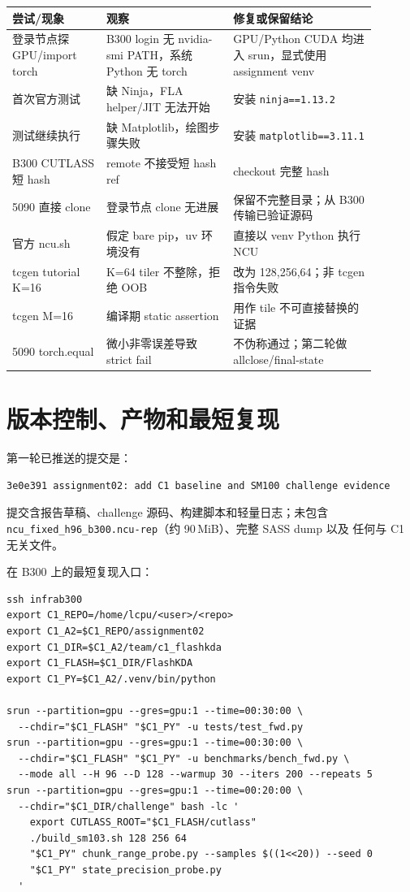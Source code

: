 \documentclass[11pt,a4paper,fontset=none]{ctexart}
\newcommand{\code}[1]{\texttt{#1}}
\begin{document}
\begin{longtable}{@{}L{0.23\linewidth}L{0.31\linewidth}L{0.35\linewidth}@{}}
\toprule
尝试/现象 & 观察 & 修复或保留结论 \\
\midrule
\endhead
\bottomrule
\endlastfoot
登录节点探 GPU/import torch & B300 login 无 nvidia-smi PATH，系统 Python 无 torch & GPU/Python CUDA 均进入 srun，显式使用 assignment venv \\
首次官方测试 & 缺 Ninja，FLA helper/JIT 无法开始 & 安装 \code{ninja==1.13.2} \\
测试继续执行 & 缺 Matplotlib，绘图步骤失败 & 安装 \code{matplotlib==3.11.1} \\
B300 CUTLASS 短 hash & remote 不接受短 hash ref & checkout 完整 hash \\
5090 直接 clone & 登录节点 clone 无进展 & 保留不完整目录；从 B300 传输已验证源码 \\
官方 ncu.sh & 假定 bare pip，uv 环境没有 & 直接以 venv Python 执行 NCU \\
tcgen tutorial K=16 & K=64 tiler 不整除，拒绝 OOB & 改为 128,256,64；非 tcgen 指令失败 \\
tcgen M=16 & 编译期 static assertion & 用作 tile 不可直接替换的证据 \\
5090 torch.equal & 微小非零误差导致 strict fail & 不伪称通过；第二轮做 allclose/final-state \\
\end{longtable}

\section{版本控制、产物和最短复现}

第一轮已推送的提交是：

\begin{lstlisting}
3e0e391 assignment02: add C1 baseline and SM100 challenge evidence
\end{lstlisting}

提交含报告草稿、challenge 源码、构建脚本和轻量日志；未包含
\code{ncu\_fixed\_h96\_b300.ncu-rep}（约 90\,MiB）、完整 SASS dump 以及
任何与 C1 无关文件。

在 B300 上的最短复现入口：

\begin{lstlisting}
ssh infrab300
export C1_REPO=/home/lcpu/<user>/<repo>
export C1_A2=$C1_REPO/assignment02
export C1_DIR=$C1_A2/team/c1_flashkda
export C1_FLASH=$C1_DIR/FlashKDA
export C1_PY=$C1_A2/.venv/bin/python

srun --partition=gpu --gres=gpu:1 --time=00:30:00 \
  --chdir="$C1_FLASH" "$C1_PY" -u tests/test_fwd.py
srun --partition=gpu --gres=gpu:1 --time=00:30:00 \
  --chdir="$C1_FLASH" "$C1_PY" -u benchmarks/bench_fwd.py \
  --mode all --H 96 --D 128 --warmup 30 --iters 200 --repeats 5
srun --partition=gpu --gres=gpu:1 --time=00:20:00 \
  --chdir="$C1_DIR/challenge" bash -lc '
    export CUTLASS_ROOT="$C1_FLASH/cutlass"
    ./build_sm103.sh 128 256 64
    "$C1_PY" chunk_range_probe.py --samples $((1<<20)) --seed 0
    "$C1_PY" state_precision_probe.py
  '
\end{lstlisting}
\end{document}
